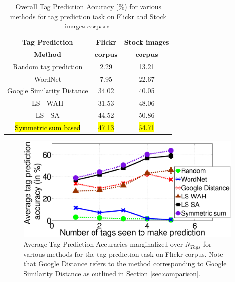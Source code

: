 \begin{table}[htbp]
\fontsize{8pt}{1em}\selectfont
\begin{center}
\caption{Overall Tag Prediction Accuracy (\%) for various methods for tag prediction task on Flickr and Stock images corpora. }
\label{tab:TPFlickr117Summary}
\begin{tabular}{|c|c|c|}
		\hline
		\textbf{Tag Prediction} & \textbf{Flickr} & \textbf{Stock images} \\ 
		\textbf{Method} & \textbf{corpus} & \textbf{corpus}\\ 
		\hline 
		 Random tag prediction   & 2.29  & 13.21 \\
		\hline
		 WordNet  & 7.95  & 22.67 \\
		\hline
		Google Similarity Distance & 34.02 & 40.05\\
		\hline 
		 LS - WAH &  31.53  & 48.06\\
		\hline
		LS - SA &  44.52 & 50.86 \\
		\hline
		\hl{Symmetric sum based} &  \hl{47.13} & \hl{54.71} \\
		\hline
\end{tabular}
\end{center}
\end{table}
\begin{figure}[htbp]
\centering
\includegraphics[width=0.65\linewidth]{TagTree/TPFlickr_rebuttal}
\caption[Average Tag Prediction Accuracies marginalized over $N_{Tags}$ for various methods for the tag prediction task on Flickr corpus. ]{Average Tag Prediction Accuracies marginalized over $N_{Tags}$ for various methods for the tag prediction task on Flickr corpus. Note that Google Distance refers to the method corresponding to Google Similarity Distance as outlined in Section \ref{sec:comparison}.} 
\label{fig:FWS117TagPredGraph}
\end{figure}
